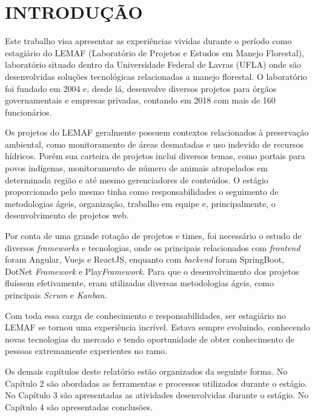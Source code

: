 \chapter{INTRODUÇÃO}
\label{cap:introducao}

Este trabalho visa apresentar as experiências vividas durante o período como estagiário do LEMAF (Laboratório de Projetos e Estudos
em Manejo Florestal), laboratório situado dentro da Universidade Federal de Lavras (UFLA) onde são desenvolvidas soluções tecnológicas relacionadas a manejo florestal.
O laboratório foi fundado em 2004 e, desde lá, desenvolve diversos projetos para órgãos governamentais e empresas privadas, contando em 2018 com mais de 160 funcionários.

Os projetos do LEMAF geralmente possuem contextos relacionados à preservação ambiental, como monitoramento de áreas desmatadas e uso indevido de recursos hídricos. Porém sua carteira de projetos inclui diversos temas, como portais para povos indígenas, monitoramento de número de animais atropelados em determinada região e até mesmo gerenciadores de conteúdos.   
O estágio proporcionado pelo mesmo tinha como responsabilidades o seguimento de metodologias ágeis, organização, trabalho em equipe e, principalmente, o desenvolvimento de projetos web.

Por conta de uma grande rotação de projetos e times, foi necessário o estudo de diversos \textit{frameworks} e tecnologias, onde os principais relacionados com \textit{frontend} foram Angular, Vuejs e ReactJS, enquanto com \textit{backend} foram SpringBoot, DotNet \textit{Framework} e Play\textit{Framework}.
Para que o desenvolvimento dos projetos fluíssem efetivamente, eram utilizadas diversas metodologias ágeis, como principais \textit{Scrum} e \textit{Kanban}.

Com toda essa carga de conhecimento e responsabilidades, ser estagiário no LEMAF se tornou uma experiência incrível. Estava sempre evoluindo, conhecendo novas tecnologias do mercado e tendo oportunidade de obter conhecimento de pessoas extremamente experientes no ramo.

Os demais capítulos deste relatório estão organizados da seguinte forma.  No Capítulo 2 são abordadas as ferramentas e processos utilizados durante o estágio. No Capítulo 3 são apresentadas as atividades desenvolvidas durante o estágio. No Capítulo 4 são apresentadas conclusões.